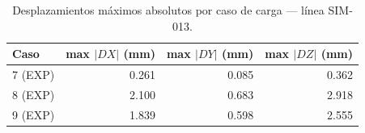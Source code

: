 \begin{table}[htbp]
  \centering
  \small
  \caption{Desplazamientos máximos absolutos por caso de carga — línea SIM-013.}
  \label{tab:desplaz-max}
  \begin{tabular}{lrrr}
    \toprule
    Caso & max $|DX|$ (\si{mm}) & max $|DY|$ (\si{mm}) & max $|DZ|$ (\si{mm}) \\
    \midrule
    7 (EXP) & 0.261 & 0.085 & 0.362 \\
    8 (EXP) & 2.100 & 0.683 & 2.918 \\
    9 (EXP) & 1.839 & 0.598 & 2.555 \\
    \bottomrule
  \end{tabular}
\end{table}
